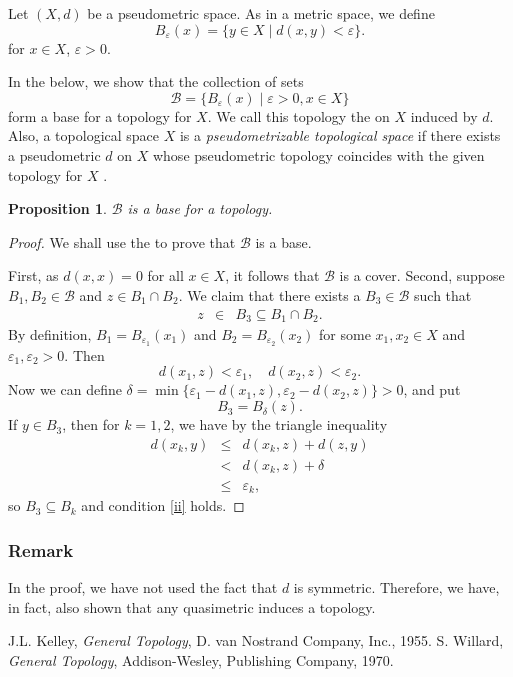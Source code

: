\documentclass[12pt]{article}
\newtheorem{prop}{Proposition}
\begin{document}
Let $(X,d)$ be a pseudometric space. As in a metric space, we define
$$
  B_\varepsilon(x)=\{ y\in X\mid d(x,y)<\varepsilon \}.
$$
for $x\in X$, $\varepsilon>0$.
  
In the below, we show that the collection of sets 
$$ 
\mathscr{B}= \{ B_\varepsilon(x)\mid \varepsilon>0, x\in X\}
$$
form a base for a topology for $X$. We call this topology
the  on $X$ 
induced by $d$. Also,
a topological space $X$ is a \emph{pseudometrizable topological space}
if there exists a pseudometric $d$ on $X$ whose
pseudometric topology coincides with the given topology 
for $X$ \cite{kelley, willard}. 


\begin{prop} 
$\mathscr{B}$ is a base for a topology.
\end{prop}


\begin{proof} We shall use the  
to prove that $\mathscr{B}$ is a base.

First, as $d(x,x)=0$ for all $x\in X$, it follows 
   that $\mathscr{B}$ is a cover. 
Second, suppose $B_1,B_2\in \mathscr{B}$ and $z\in B_1\cap B_2$. 
We claim that there exists a $B_3\in \mathscr{B}$ such that 
\begin{eqnarray}
\label{ii} 
  z&\in& B_3\subseteq B_1\cap B_2.
\end{eqnarray}
By definition, $B_1 = B_{\varepsilon_1}(x_1)$ 
   and $B_2 = B_{\varepsilon_2}(x_2)$ for some $x_1,x_2\in X$
and $\varepsilon_1,\varepsilon_2>0$. Then
$$
  d(x_1, z)<\varepsilon_1, \quad   d(x_2, z)<\varepsilon_2.
$$
Now we can define $\delta = \min\{ \varepsilon_1-d(x_1, z), \varepsilon_2-d(x_2, z)\}>0$, and put
$$
  B_3 = B_\delta(z).
$$
If $y\in B_3$, then for $k=1,2$, we have by the triangle inequality
\begin{eqnarray*}
d(x_k,y) &\le & d(x_k, z) + d(z,y) \\
         &< & d(x_k, z) + \delta \\
         &\le & \varepsilon_k,
\end{eqnarray*}
so $B_3\subseteq B_k$ and condition \ref{ii} holds. 
\end{proof}

\subsubsection*{Remark}
In the proof, we have not used the fact that $d$ is 
symmetric. Therefore, we have, in fact, also shown that any 
quasimetric induces a topology.
 
\begin{thebibliography}{9}
 J.L. Kelley, \emph{General Topology},
D. van Nostrand Company, Inc., 1955.
 S. Willard, \emph{General Topology},
Addison-Wesley, Publishing Company, 1970.
\end{thebibliography}
\end{document}
